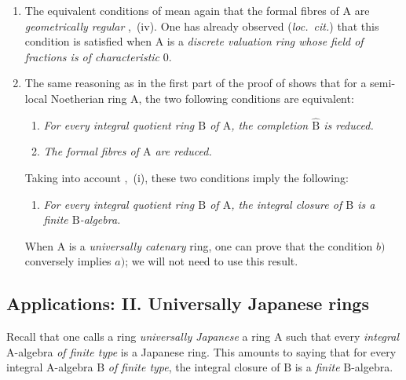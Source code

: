 \begin{remarks}[7.6.7]
\label{IV.7.6.7}
\begin{enumerate}[label=(\roman*)]
  \item The equivalent conditions of  mean again that the formal fibres of $\mathrm{A}$ are \emph{geometrically regular} ,~(iv). One has already observed (\emph{loc.\ cit.}) that this condition is satisfied when $\mathrm{A}$ is a \emph{discrete valuation ring whose field of fractions is of characteristic} $0$.

  \item The same reasoning as in the first part of the proof of  shows that for a semi-local Noetherian ring $\mathrm{A}$, the two following conditions are equivalent:
\begin{enumerate}[label=\emph{\alph*)}]
  \item[\textup{a)}] \emph{For every integral quotient ring $\mathrm{B}$ of $\mathrm{A}$, the completion $\widehat{\mathrm{B}}$ is reduced.}
  \item[\rm a$'$)] \emph{The formal fibres of $\mathrm{A}$ are reduced.}
\end{enumerate}
Taking into account ,~(i), these two conditions imply the following:
\begin{enumerate}[label=\emph{\alph*)}]
  \item[b)] \emph{For every integral quotient ring $\mathrm{B}$ of $\mathrm{A}$, the integral closure of $\mathrm{B}$ is a finite $\mathrm{B}$-algebra.}
\end{enumerate}
When $\mathrm{A}$ is a \emph{universally catenary} ring, one can prove that the condition $b)$ conversely implies $a)$; we will not need to use this result.
\end{enumerate}
\end{remarks}


\subsection{Applications: II. Universally Japanese rings}
\label{subsection:IV.7.7}

\begin{env}[7.7.1]
\label{IV.7.7.1}
Recall  that one calls a ring \emph{universally Japanese} a ring $\mathrm{A}$ such that every \emph{integral} $\mathrm{A}$-algebra \emph{of finite type} is a Japanese ring. This amounts to saying that for every integral $\mathrm{A}$-algebra $\mathrm{B}$ \emph{of finite type}, the integral closure of $\mathrm{B}$ is a \emph{finite} $\mathrm{B}$-algebra.
\end{env}


